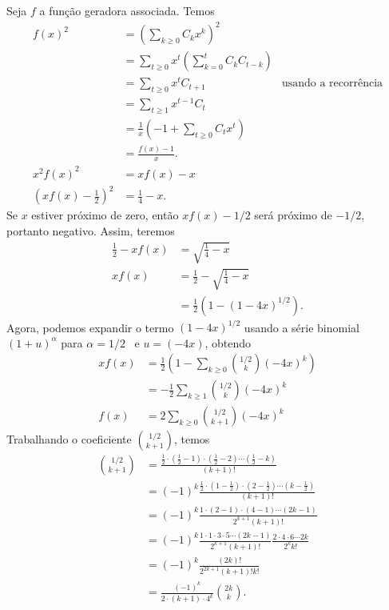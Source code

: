 Seja $f$ a função geradora associada.
Temos
\begin{align*}
    f(x)^2 &= \left(\sum_{k \geq 0} C_k x^k\right)^2 \\
           &= \sum_{t \geq 0} x^t \left( \sum_{k = 0}^t C_k C_{t-k} \right) \\
           &= \sum_{t \geq 0} x^t C_{t+1}
            & \text{usando a recorrência}\\
           &= \sum_{t \geq 1} x^{t-1} C_t \\
           &= \frac 1 x \left( -1 + \sum_{t \geq 0} C_t x^t \right) \\
           &= \frac{f(x) - 1}{x}. \\
    x^2 f(x)^2 &= xf(x) - x \\
    \left(xf(x) - \frac 1 2\right)^2 &= \frac 1 4 - x.
\end{align*}
Se $x$ estiver próximo de zero,
então $xf(x) - 1/2$ será próximo de $-1/2$,
portanto negativo.
Assim, teremos
\begin{align*}
    \frac 1 2 - xf(x) &= \sqrt{\frac 1 4 - x} \\
    xf(x) &= \frac 1 2 - \sqrt{\frac 1 4 - x} \\
          &= \frac 1 2 (1 - (1 - 4x)^{1/2}).
\end{align*}
Agora, podemos expandir o termo $(1 - 4x)^{1/2}$
usando a série binomial $(1 + u)^\alpha$ para $\alpha = 1/2$~\cite[p.~487]{Spivak1994}
e $u = (-4x)$,
obtendo
\begin{align*}
    xf(x) &= \frac 1 2 \left( 1 - \sum_{k \geq 0} \binom{1/2}{k} (-4x)^k \right) \\
          &= -\frac 1 2 \sum_{k \geq 1} \binom{1/2}{k} (-4x)^k \\
    f(x) &= 2 \sum_{k \geq 0} \binom{1/2}{k+1} (-4x)^k
\end{align*}
Trabalhando o coeficiente $\binom{1/2}{k+1}$, temos
\begin{align*}
    \binom{1/2}{k+1} &= \frac{
        \frac 1 2 \cdot (\frac 1 2 - 1) \cdot (\frac 1 2 - 2) \cdots (\frac 1 2 - k)
    }{ (k+1)! } \\
    &= (-1)^k \frac{
        \frac 1 2 \cdot (1 - \frac 1 2) \cdot (2 - \frac 1 2) \cdots (k - \frac 1 2)
    }{ (k+1)! } \\
    &= (-1)^k \frac{
        1 \cdot (2 - 1) \cdot (4 - 1) \cdots (2k - 1)
    }{ 2^{k + 1} (k + 1)! } \\
    &= (-1)^k \frac{ 1 \cdot 1 \cdot 3 \cdot 5 \cdots (2k - 1) }{2^{k+1} (k+1)!}
        \frac{2 \cdot 4 \cdot 6 \cdots 2k}{2^k k!} \\
    &= (-1)^k \frac{ (2k)! }{2^{2k+1} (k+1)! k!} \\
    &= \frac{(-1)^k}{2 \cdot (k+1) \cdot 4^k} \binom{2k}{k}.
\end{align*}
